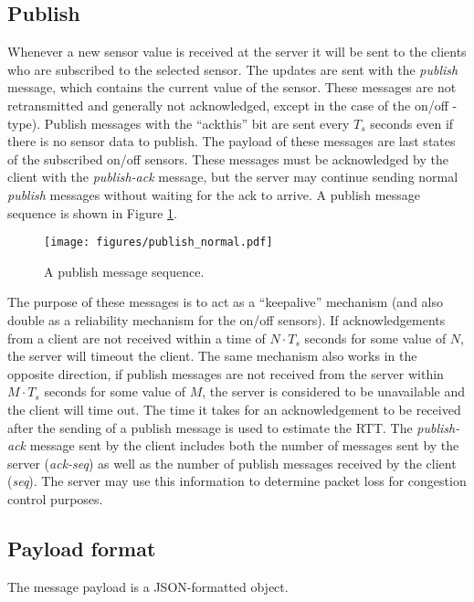 \documentclass[a4paper]{article}
\begin{document}
\subsection{Publish}
Whenever a new sensor value is received at the server it will be sent to the 
clients who are subscribed to the selected sensor. The updates are sent with
the \emph{publish} message, which contains the current value of the sensor.
These messages are not retransmitted and generally not acknowledged, except in the case of the on/off -type). Publish
messages with the ``ackthis'' bit are sent every $T_s$ seconds even if there
is no sensor data to publish. The payload of these messages are last states
of the subscribed on/off sensors. These messages must be acknowledged by the client 
with the \emph{publish-ack} message, but the server may continue sending normal \emph{publish} messages without waiting for the ack to arrive. A publish message
sequence is shown in Figure \ref{fig:pub_normal}.

\begin{figure}
	\centering
    \texttt{[image: figures/publish\_normal.pdf]}
    \caption{A publish message sequence.}
    \label{fig:pub_normal}
\end{figure}

The purpose of these messages is to act as a ``keepalive'' mechanism (and also double
as a reliability mechanism for the on/off sensors). If acknowledgements from a client
are not received within a time of $N \cdot T_s$ seconds for some value of $N$, the 
server will timeout the client. The same mechanism also works in the opposite 
direction, if publish messages are not received from the server within 
$M \cdot T_s$ seconds for some value of $M$,
the server is considered to be unavailable and the client will time out. The time it takes for an acknowledgement to be received after the sending of
a publish message is used to estimate the RTT.
The \emph{publish-ack} message sent by the client includes both the number of messages sent by the server (\emph{ack-seq}) as well as the number of publish messages received by the client (\emph{seq}).
The server may use this information to determine packet loss for congestion control purposes.

\subsection{Payload format}
\label{payload-format}

The message payload is a JSON-formatted object.
\end{document}
